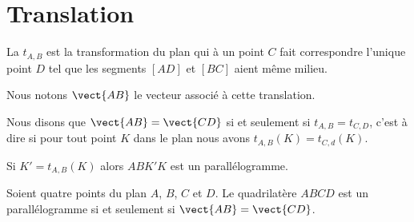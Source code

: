
\section{Translation}

\begin{multicols}{2}
\begin{definition}
    La  \( t_{A,B}\) est la transformation du plan qui à un point \( C\) fait correspondre l'unique point \( D\) tel que les segments \( [AD]\) et \( [BC]\) aient même milieu.
\end{definition}

\columnbreak


\end{multicols}
Nous notons \( \vect{ AB }\) le vecteur associé à cette translation.

\begin{definition}
    Nous disons que \( \vect{ AB }=\vect{ CD }\) si et seulement si \( t_{A,B}=t_{C,D}\), c'est à dire si pour tout point \( K\) dans le plan nous avons \( t_{A,B}(K)=t_{C,d}(K)\).
\end{definition}

\begin{Aretenir}
    Si \( K'=t_{A,B}(K)\) alors \( ABK'K\) est un parallélogramme.
\end{Aretenir}

\begin{propriete}
    Soient quatre points du plan \( A\), \( B\), \( C\) et \( D\). Le quadrilatère \( ABCD\) est un parallélogramme si et seulement si \( \vect{ AB }=\vect{ CD }\).
\end{propriete}

